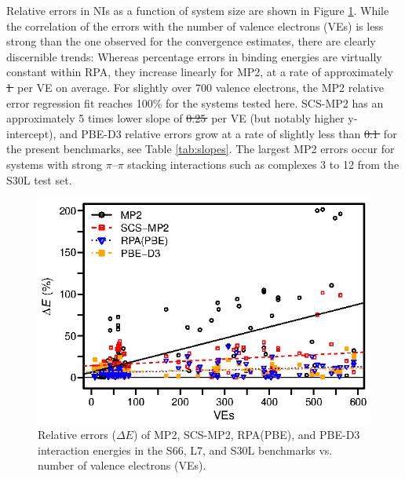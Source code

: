 \documentclass[journal=jctcce,manuscript=article]{achemso}
\providecommand{\DIFadd}[1]{{\protect\color{blue}\uwave{#1}}} %
\providecommand{\DIFdel}[1]{{\protect\color{red}\sout{#1}}}                      %
\providecommand{\DIFaddbegin}{} %
\providecommand{\DIFaddend}{} %
\providecommand{\DIFdelbegin}{} %
\providecommand{\DIFdelend}{} %
\newcommand{\DIFscaledelfig}{0.5}
\newlength{\DIFdelgraphicswidth} %
\newlength{\DIFdelgraphicsheight} %
\newcommand{\DIFaddincludegraphics}[2][]{{\color{blue}\fbox{\DIFOincludegraphics[#1]{#2}}}} %
\newcommand{\DIFdelincludegraphics}[2][]{%
\sbox{\DIFdelgraphicsbox}{\DIFOincludegraphics[#1]{#2}}%
\settoboxwidth{\DIFdelgraphicswidth}{\DIFdelgraphicsbox} %
\settoboxtotalheight{\DIFdelgraphicsheight}{\DIFdelgraphicsbox} %
\scalebox{\DIFscaledelfig}{%
\parbox[b]{\DIFdelgraphicswidth}{\usebox{\DIFdelgraphicsbox}\\[-\baselineskip] \rule{\DIFdelgraphicswidth}{0em}}\llap{\resizebox{\DIFdelgraphicswidth}{\DIFdelgraphicsheight}{%
\setlength{\unitlength}{\DIFdelgraphicswidth}%
\begin{picture}(1,1)%
\thicklines\linethickness{2pt} %
{\color[rgb]{1,0,0}\put(0,0){\framebox(1,1){}}}%
{\color[rgb]{1,0,0}\put(0,0){\line( 1,1){1}}}%
{\color[rgb]{1,0,0}\put(0,1){\line(1,-1){1}}}%
\end{picture}%
}\hspace*{3pt}}} %
} %
\DeclareRobustCommand{\DIFaddbegin}{\DIFOaddbegin \let\includegraphics\DIFaddincludegraphics} %
\DeclareRobustCommand{\DIFaddend}{\DIFOaddend \let\includegraphics\DIFOincludegraphics} %
\DeclareRobustCommand{\DIFdelbegin}{\DIFOdelbegin \let\includegraphics\DIFdelincludegraphics} %
\DeclareRobustCommand{\DIFdelend}{\DIFOaddend \let\includegraphics\DIFOincludegraphics} %
\begin{document}
Relative errors in NIs as a function of system size are shown in
Figure \ref{fig:mp2_rpa_comp}. While the correlation of the errors with
the number of valence electrons (VEs) is
less strong than the one observed for the convergence estimates, there
are clearly discernible trends: Whereas percentage errors in binding
energies are virtually constant within RPA, they increase linearly for
MP2, at a rate of approximately \DIFdelbegin \DIFdel{1\textperthousand\, }\DIFdelend \DIFaddbegin \DIFadd{0.1$\%$, }\DIFaddend per VE
on average. For slightly over 700 valence electrons, the MP2 relative error 
regression fit reaches 100\% for the systems tested here. SCS-MP2 has an
approximately 5 times lower slope of \DIFdelbegin \DIFdel{0.25\textperthousand\, }\DIFdelend \DIFaddbegin \DIFadd{0.025$\%$, }\DIFaddend per VE
(but notably higher y-intercept), and PBE-D3 relative errors grow
at a rate of slightly less than \DIFdelbegin \DIFdel{0.1\textperthousand\, }\DIFdelend \DIFaddbegin \DIFadd{0.01$\%$, }\DIFaddend for the present
benchmarks, see Table \ref{tab:slopes}. The largest MP2 errors occur for
systems with strong $\pi$--$\pi$ stacking interactions such as complexes 3
to 12 from the S30L test set.\cite{Sure15JChemTheoryComput}

\begin{figure}[hbpt]
  \centering
  \includegraphics{mp2_rpa_signed.eps}
  \caption{Relative errors ($\Delta E$) of MP2, SCS-MP2, RPA(PBE), and
    PBE-D3 interaction energies in the
    S66,\cite{doi:10.1021/ct2002946,doi:10.1021/ct200523a} 
    L7,\cite{doi:10.1021/ct400036b} and
    S30L\cite{Sure15JChemTheoryComput} benchmarks vs.
    number of valence electrons (VEs).}
  \label{fig:mp2_rpa_comp}
\end{figure}
\end{document}
